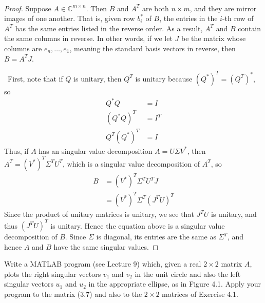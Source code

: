 \documentclass[12pt]{article}
\newenvironment{ex}[2][Exercise]{\begin{trivlist}
		\item[\hskip \labelsep {\bfseries #1}\hskip \labelsep {\bfseries #2.}]}{\end{trivlist}}
\newenvironment{sol}[1][Solution]{\begin{trivlist}
		\item[\hskip \labelsep {\bfseries #1:}]}{\end{trivlist}}
\begin{document}
\begin{sol}
	\
	\begin{proof}
		Suppose $A\in\mathbb{C}^{m\times n}$. Then $B$ and $A^T$ are both $n\times m$, and they
		are mirror images of one another. That is, given row $b_i^*$ of $B$, the entries in the $i$-th row
		of $A^T$ has the same entries listed in the reverse order. As a result, $A^T$ and $B$ contain
		the same columns in reverse. In other words, if we let $J$ be the matrix whose columns are
		$e_n,\ldots,e_1$, meaning the standard basis vectors in reverse, then $B=A^TJ$.
		
		\
		First, note that if $Q$ is unitary, then $Q^T$ is unitary because $(Q^*)^T=(Q^T)^*$, so
		\begin{align*}
			Q^*Q&=I\\
			(Q^*Q)^T&=I^T\\
			Q^T(Q^*)^T&=I
		\end{align*}
		Thus, if $A$ has an singular value decomposition $A=U\Sigma V^*$, then $A^T=(V^*)^T\Sigma^TU^T$, which is a singular value decomposition of
		$A^T$, so
		\begin{align*}
			B &= (V^*)^T\Sigma^T U^TJ\\
			&=(V^*)^T\Sigma^T (J^TU)^T
		\end{align*}
		Since the product of unitary matrices is unitary, we see that $J^TU$ is unitary, and thus
		$(J^TU)^T$ is unitary. Hence the equation above is a singular value decomposition of $B$.
		Since $\Sigma$ is diagonal, its entries are the same as $\Sigma^T$, and hence $A$ and $B$ have
		the same singular values.
	\end{proof}
\end{sol}

\begin{ex}{4.3}
	Write a MATLAB program (see Lecture 9) which, given a real $2\times 2$ matrix $A$, plots the right
	singular vectors $v_1$ and $v_2$ in the unit circle and also the left singular vectors $u_1$ and
	$u_2$ in the appropriate ellipse, as in Figure 4.1. Apply your program to the matrix (3.7) and
	also to the $2\times 2$ matrices of Exercise 4.1.
\end{ex}
\end{document}
